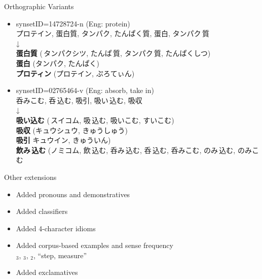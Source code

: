 \documentclass{beamer}
\begin{document}
\begin{frame}{Orthographic Variants}

  {\jafont
  \begin{itemize}
  \item synsetID=14728724-n (Eng: protein)
    \\ プロテイン, 蛋白質, タンパク, たんぱく質, 蛋白, タンパク\,質
    \\ \hspace{15em} ↓
    \\ \textbf{蛋白質} (\,タンパクシツ, たんぱ\,質, タンパク\,質, たんぱくしつ)
    \\ \textbf{蛋白} (タンパク, たんぱく)
    \\ \textbf{プロティン} (プロテイン, ぷろてぃん)
  \item synsetID=02765464-v (Eng: absorb, take in)
    \\ 呑みこむ, 呑\,込む, 吸引, 吸い\,込む, 吸収
    \\\hspace{20em} ↓
    \\ \textbf{吸い込む}  (\,スイコム, 吸\,込む, 吸いこむ, すいこむ)
    \\ \textbf{吸収} (キュウシュウ, きゅうしゅう)
    \\ \textbf{吸引} キュウイン, きゅういん)
    \\ \textbf{飲み\,込む} (ノミコム, 飲\,込む, 呑み\,込む, 呑\,込む, 呑みこむ, のみ\,込む, のみこむ
  \end{itemize}}
\end{frame}

\begin{frame}{Other extensions}
  \begin{itemize}
  \item Added pronouns and demonstratives
    \\ 
  \item Added classifiers
    \\ 
  \item Added 4-character idioms
    \\ 
  \item Added corpus-based examples and sense frequency
    \\ $_3$, $_3$, $_2$, 
    ``step, measure''
   \item Added exclamatives
    \\ 
  \end{itemize}
\end{frame}
\end{document}
